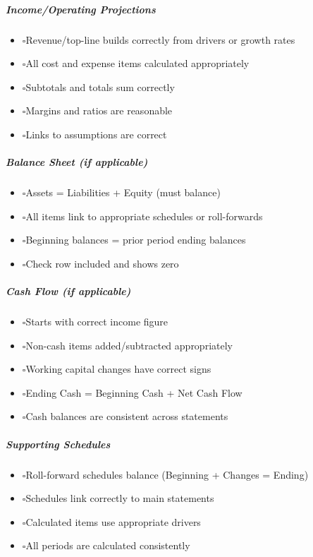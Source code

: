 \documentclass[11pt]{article}
\newcommand{\UncheckedBox}{$\square$}
\begin{document}
\subparagraph{Income/Operating Projections}\mbox{}\par
\begin{itemize}[leftmargin=*,itemsep=2pt,topsep=2pt]
\item {} \UncheckedBox Revenue/top-line builds correctly from drivers or growth rates
\item {} \UncheckedBox All cost and expense items calculated appropriately
\item {} \UncheckedBox Subtotals and totals sum correctly
\item {} \UncheckedBox Margins and ratios are reasonable
\item {} \UncheckedBox Links to assumptions are correct
\end{itemize}

\subparagraph{Balance Sheet (if applicable)}\mbox{}\par
\begin{itemize}[leftmargin=*,itemsep=2pt,topsep=2pt]
\item {} \UncheckedBox Assets = Liabilities + Equity (must balance)
\item {} \UncheckedBox All items link to appropriate schedules or roll-forwards
\item {} \UncheckedBox Beginning balances = prior period ending balances
\item {} \UncheckedBox Check row included and shows zero
\end{itemize}

\subparagraph{Cash Flow (if applicable)}\mbox{}\par
\begin{itemize}[leftmargin=*,itemsep=2pt,topsep=2pt]
\item {} \UncheckedBox Starts with correct income figure
\item {} \UncheckedBox Non-cash items added/subtracted appropriately
\item {} \UncheckedBox Working capital changes have correct signs
\item {} \UncheckedBox Ending Cash = Beginning Cash + Net Cash Flow
\item {} \UncheckedBox Cash balances are consistent across statements
\end{itemize}

\subparagraph{Supporting Schedules}\mbox{}\par
\begin{itemize}[leftmargin=*,itemsep=2pt,topsep=2pt]
\item {} \UncheckedBox Roll-forward schedules balance (Beginning + Changes = Ending)
\item {} \UncheckedBox Schedules link correctly to main statements
\item {} \UncheckedBox Calculated items use appropriate drivers
\item {} \UncheckedBox All periods are calculated consistently
\end{itemize}
\end{document}
